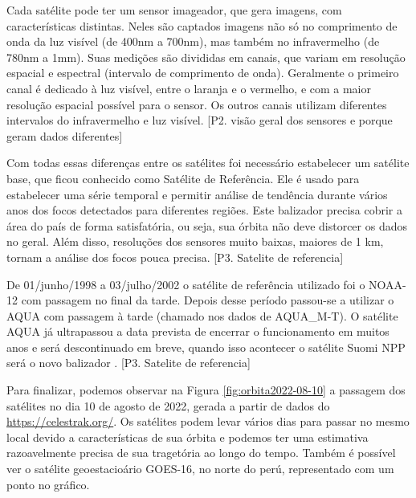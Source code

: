 \documentclass[cic,tc]{iiufrgs}
\begin{document}
Cada satélite pode ter um sensor imageador, que gera imagens, com características
distintas. Neles são captados imagens não só no comprimento de onda da luz
visível (de 400nm a 700nm), mas também no infravermelho (de 780nm a 1mm). 
Suas medições são divididas em canais, que
variam em resolução espacial e espectral (intervalo de comprimento de onda). 
Geralmente o primeiro canal é dedicado à luz visível, entre o laranja e o 
vermelho, e com a maior resolução espacial possível para o sensor. Os outros 
canais utilizam diferentes intervalos do infravermelho e luz visível.
[P2. visão geral dos sensores e porque geram dados diferentes] \par

Com todas essas diferenças entre os satélites foi necessário estabelecer um 
satélite base, que ficou conhecido como Satélite de Referência. Ele é usado 
para estabelecer uma série temporal e permitir análise de tendência durante 
vários anos dos focos detectados para diferentes regiões. 
Este balizador precisa cobrir a área do país de forma
satisfatória, ou seja, sua órbita não deve distorcer os dados no geral. 
Além disso, resoluções dos sensores muito baixas, maiores de 1 km, tornam a 
análise dos focos pouca precisa. [P3. Satelite de referencia] \par

De 01/junho/1998 a 03/julho/2002 o satélite de referência utilizado foi o NOAA-12
com passagem no final da tarde. Depois desse período passou-se a utilizar o 
AQUA com passagem à tarde (chamado nos dados de AQUA\_M-T). O satélite AQUA 
já ultrapassou a data prevista de encerrar o funcionamento em muitos anos e 
será descontinuado em breve, quando isso acontecer o satélite Suomi NPP será o novo
balizador \citep{PerguntasFrequentesINPE}. [P3. Satelite de referencia] \par

Para finalizar, podemos observar na Figura \ref{fig:orbita2022-08-10} a passagem 
dos satélites no dia 10 de agosto de 2022, gerada a partir de 
dados do \url{https://celestrak.org/}. Os satélites podem levar 
vários dias para passar no mesmo local devido a características de sua órbita e 
podemos ter uma estimativa razoavelmente precisa de sua tragetória ao longo do 
tempo. Também é possível ver o satélite geoestacioário GOES-16, no norte 
do perú, representado com um ponto no gráfico. \par
\end{document}
